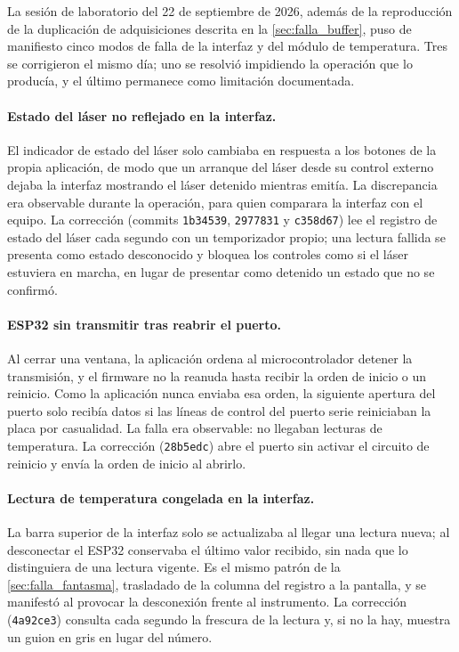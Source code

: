 La sesión de laboratorio del 22 de septiembre de 2026, además de la
reproducción de la duplicación de adquisiciones descrita en la
\cref{sec:falla_buffer}, puso de manifiesto cinco modos de falla de la
interfaz y del módulo de temperatura. Tres se corrigieron el mismo día;
uno se resolvió impidiendo la operación que lo producía, y el último
permanece como limitación documentada.

\paragraph{Estado del láser no reflejado en la interfaz.} El indicador
de estado del láser solo cambiaba en respuesta a los botones de la
propia aplicación, de modo que un arranque del láser desde su control
externo dejaba la interfaz mostrando el láser detenido mientras emitía.
La discrepancia era observable durante la operación, para quien
comparara la interfaz con el equipo. La corrección (commits
\texttt{1b34539}, \texttt{2977831} y \texttt{c358d67}) lee el registro
de estado del láser cada segundo con un temporizador propio; una
lectura fallida se presenta como estado desconocido y bloquea los
controles como si el láser estuviera en marcha, en lugar de presentar
como detenido un estado que no se confirmó.

\paragraph{ESP32 sin transmitir tras reabrir el puerto.} Al cerrar una
ventana, la aplicación ordena al microcontrolador detener la
transmisión, y el firmware no la reanuda hasta recibir la orden de
inicio o un reinicio. Como la aplicación nunca enviaba esa orden, la
siguiente apertura del puerto solo recibía datos si las líneas de
control del puerto serie reiniciaban la placa por casualidad. La falla
era observable: no llegaban lecturas de temperatura. La corrección
(\texttt{28b5edc}) abre el puerto sin activar el circuito de reinicio y
envía la orden de inicio al abrirlo.

\paragraph{Lectura de temperatura congelada en la interfaz.} La barra
superior de la interfaz solo se actualizaba al llegar una lectura
nueva; al desconectar el ESP32 conservaba el último valor recibido, sin
nada que lo distinguiera de una lectura vigente. Es el mismo patrón de
la \cref{sec:falla_fantasma}, trasladado de la columna del registro a
la pantalla, y se manifestó al provocar la desconexión frente al
instrumento. La corrección (\texttt{4a92ce3}) consulta cada segundo la
frescura de la lectura y, si no la hay, muestra un guion en gris en
lugar del número.


